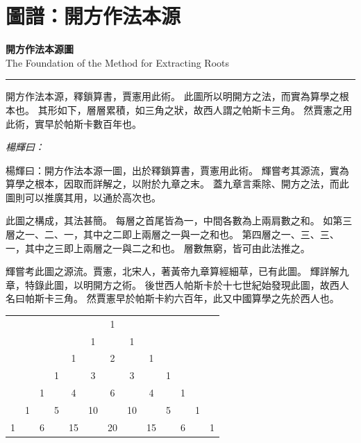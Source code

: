 \documentclass[11pt,a4paper]{article}
\newenvironment{yanghuicomment}{%
  \par\noindent\textcolor{commentarycolor}{\small\textit{楊輝曰：}}%
  \ignorespaces
}{\par\vspace{0.5em}}
\begin{document}
\newpage

\section*{圖譜：開方作法本源}

\begin{center}
{\LARGE\bfseries\color{titlecolor} 開方作法本源圖}\\[0.5cm]
{\large\color{sectioncolor} The Foundation of the Method for Extracting Roots}
\end{center}

\begin{center}
\rule{0.6\textwidth}{0.8pt}
\end{center}

開方作法本源，釋鎖算書，賈憲用此術。
此圖所以明開方之法，而實為算學之根本也。
其形如下，層層累積，如三角之狀，故西人謂之帕斯卡三角。
然賈憲之用此術，實早於帕斯卡數百年也。

\begin{yanghuicomment}
楊輝曰：開方作法本源一圖，出於釋鎖算書，賈憲用此術。
輝嘗考其源流，實為算學之根本，因取而詳解之，以附於九章之末。
蓋九章言乘除、開方之法，而此圖則可以推廣其用，以通於高次也。

此圖之構成，其法甚簡。
每層之首尾皆為一，中間各數為上兩肩數之和。
如第三層之一、二、一，其中之二即上兩層之一與一之和也。
第四層之一、三、三、一，其中之三即上兩層之一與二之和也。
層數無窮，皆可由此法推之。

輝嘗考此圖之源流。賈憲，北宋人，著黃帝九章算經細草，已有此圖。
輝詳解九章，特錄此圖，以明開方之術。
後世西人帕斯卡於十七世紀始發現此圖，故西人名曰帕斯卡三角。
然賈憲早於帕斯卡約六百年，此又中國算學之先於西人也。
\end{yanghuicomment}

\vspace{1.5em}

\begin{center}
{\color{chartcolor}
\begin{tabular}{*{13}{c}}
& & & & & & 1 & & & & & & \\[0.8em]
& & & & & 1 & & 1 & & & & & \\[0.8em]
& & & & 1 & & 2 & & 1 & & & & \\[0.8em]
& & & 1 & & 3 & & 3 & & 1 & & & \\[0.8em]
& & 1 & & 4 & & 6 & & 4 & & 1 & & \\[0.8em]
& 1 & & 5 & & 10 & & 10 & & 5 & & 1 & \\[0.8em]
1 & & 6 & & 15 & & 20 & & 15 & & 6 & & 1 \\
\end{tabular}
}
\end{center}
\end{document}

